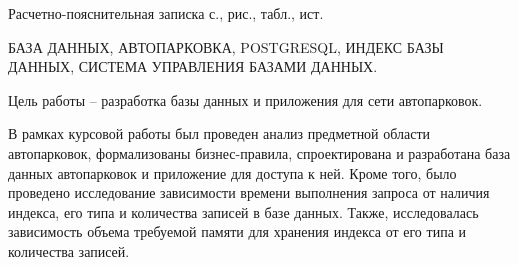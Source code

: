 
Расчетно-пояснительная записка \pageref{LastPage} с.,  рис.,  табл.,  ист.

БАЗА ДАННЫХ, АВТОПАРКОВКА, POSTGRESQL, ИНДЕКС БАЗЫ ДАННЫХ, СИСТЕМА УПРАВЛЕНИЯ БАЗАМИ ДАННЫХ.

Цель работы -- разработка базы данных и приложения для сети автопарковок.

В рамках курсовой работы был проведен анализ предметной области автопарковок, формализованы  бизнес-правила, спроектирована и разработана база данных автопарковок и приложение для доступа к ней.
Кроме того, было проведено исследование зависимости времени выполнения запроса от наличия индекса, его типа и количества записей в базе данных.
Также, исследовалась зависимость объема требуемой памяти для хранения индекса от его типа и количества записей.

